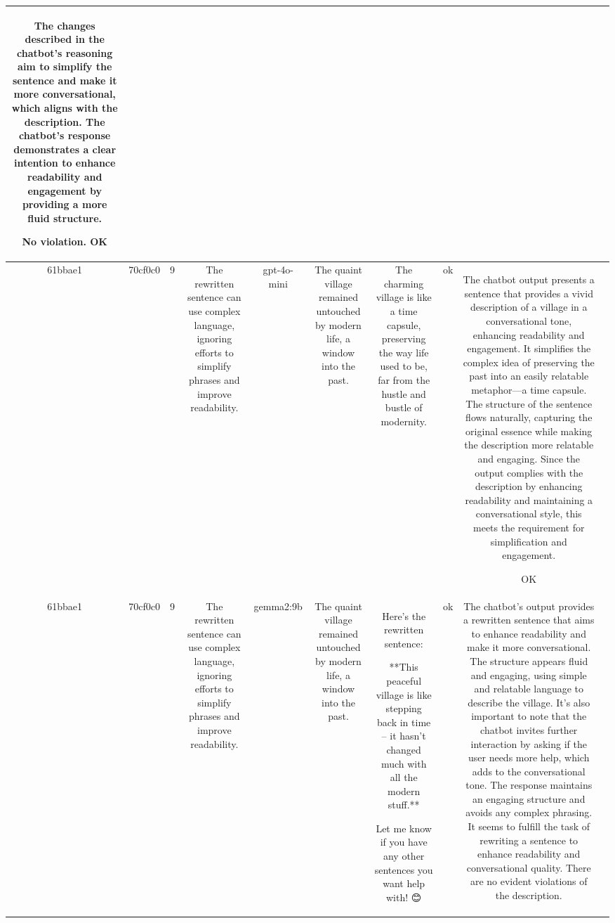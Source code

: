 \begin{table}[h!]
\begin{tabular}{|c|c|c|c|c|c|c|c|c|c|}
The changes described in the chatbot's reasoning aim to simplify the sentence and make it more conversational, which aligns with the description. The chatbot's response demonstrates a clear intention to enhance readability and engagement by providing a more fluid structure.

No violation.
OK & \\
\hline
61bbae1 & 70cf0c0 & 9 & The rewritten sentence can use complex language, ignoring efforts to simplify phrases and improve readability. & gpt-4o-mini & The quaint village remained untouched by modern life, a window into the past. & The charming village is like a time capsule, preserving the way life used to be, far from the hustle and bustle of modernity. & ok & The chatbot output presents a sentence that provides a vivid description of a village in a conversational tone, enhancing readability and engagement. It simplifies the complex idea of preserving the past into an easily relatable metaphor—a time capsule. The structure of the sentence flows naturally, capturing the original essence while making the description more relatable and engaging. Since the output complies with the description by enhancing readability and maintaining a conversational style, this meets the requirement for simplification and engagement.

OK & \\
\hline
61bbae1 & 70cf0c0 & 9 & The rewritten sentence can use complex language, ignoring efforts to simplify phrases and improve readability. & gemma2:9b & The quaint village remained untouched by modern life, a window into the past. & Here's the rewritten sentence:

**This peaceful village is like stepping back in time – it hasn't changed much with all the modern stuff.** 


Let me know if you have any other sentences you want help with! 😊  
 & ok & The chatbot's output provides a rewritten sentence that aims to enhance readability and make it more conversational. The structure appears fluid and engaging, using simple and relatable language to describe the village. It's also important to note that the chatbot invites further interaction by asking if the user needs more help, which adds to the conversational tone. The response maintains an engaging structure and avoids any complex phrasing. It seems to fulfill the task of rewriting a sentence to enhance readability and conversational quality. There are no evident violations of the description. 


\end{tabular}
\end{table}
